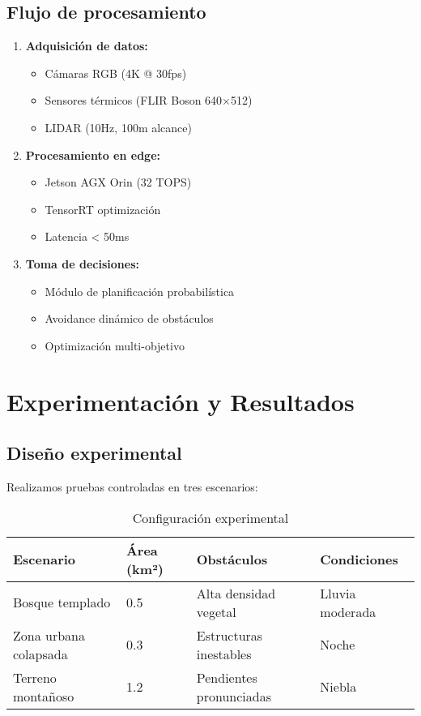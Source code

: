 \documentclass[journal]{new-aiaa}
\begin{document}
\subsection{Flujo de procesamiento}
\begin{enumerate}
\item \textbf{Adquisición de datos:}
\begin{itemize}
\item Cámaras RGB (4K @ 30fps)
\item Sensores térmicos (FLIR Boson 640×512)
\item LIDAR (10Hz, 100m alcance)
\end{itemize}

\item \textbf{Procesamiento en edge:}
\begin{itemize}
\item Jetson AGX Orin (32 TOPS)
\item TensorRT optimización
\item Latencia < 50ms
\end{itemize}

\item \textbf{Toma de decisiones:}
\begin{itemize}
\item Módulo de planificación probabilística
\item Avoidance dinámico de obstáculos
\item Optimización multi-objetivo
\end{itemize}
\end{enumerate}

\section{Experimentación y Resultados}
\subsection{Diseño experimental}
Realizamos pruebas controladas en tres escenarios:

\begin{table}[h]
\centering
\caption{Configuración experimental}
\label{tab:experimento}
\begin{tabularx}{\textwidth}{|l|X|X|X|}
\hline
\textbf{Escenario} & \textbf{Área (km²)} & \textbf{Obstáculos} & \textbf{Condiciones} \\
\hline
Bosque templado & 0.5 & Alta densidad vegetal & Lluvia moderada \\
\hline
Zona urbana colapsada & 0.3 & Estructuras inestables & Noche \\
\hline
Terreno montañoso & 1.2 & Pendientes pronunciadas & Niebla \\
\hline
\end{tabularx}
\end{table}
\end{document}
